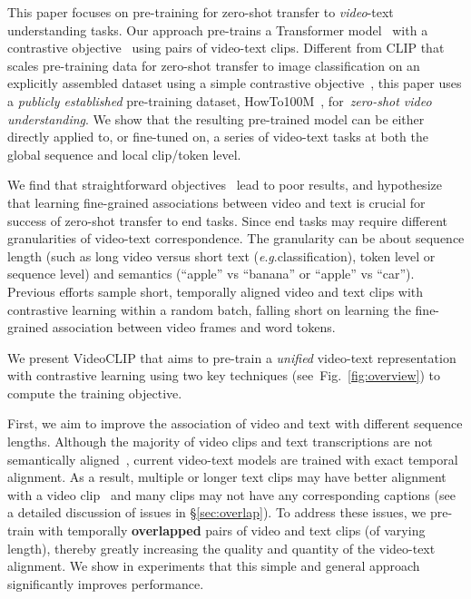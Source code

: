 \documentclass[11pt]{article}
\newcommand{\eg}{\textit{e}.\textit{g}.}
\begin{document}
This paper focuses on pre-training for zero-shot transfer to \textit{video}-text understanding tasks.
Our approach pre-trains a Transformer model~\cite{vaswani2017attention,devlin-etal-2019-bert} with a contrastive objective~\cite{oord2018representation,chen2020simple} using pairs of video-text clips. 
Different from CLIP that scales pre-training data for zero-shot transfer to image classification on an explicitly assembled dataset using a simple contrastive objective~\cite{chen2020simple}, this paper uses a \textit{publicly established} pre-training dataset, HowTo100M~\cite{miech2019howto100m}, for~\textit{zero-shot video understanding}. 
We show that the resulting pre-trained model can be either directly applied to, or fine-tuned on, a series of video-text tasks at both the global sequence and local clip/token level.
 


We find that straightforward objectives~\cite{chen2020simple} lead to poor results, and hypothesize that learning fine-grained associations between video and text is crucial for success of zero-shot transfer to end tasks. Since end tasks may require different granularities of video-text correspondence. The granularity can be about sequence length (such as long video versus short text (\eg classification), token level or sequence level) and semantics (``apple'' vs ``banana'' or ``apple'' vs ``car''). Previous efforts sample short, temporally aligned video and text clips with contrastive learning within a random batch, falling short on learning the fine-grained association between video frames and word tokens.


We present VideoCLIP 
that 
aims to pre-train a \textit{unified} video-text representation with contrastive learning using two key techniques (see~Fig.~\ref{fig:overview}) to compute the training objective. 


First, 
we aim to improve the association of video and text with different sequence lengths.
Although the majority of video clips and text transcriptions are not semantically aligned~\cite{miech2019howto100m}, current video-text models are trained with exact temporal alignment.
As a result, multiple or longer text clips may have better alignment with a video clip~\cite{miech2020end} and many
clips may not have any corresponding captions (see a detailed discussion of issues in \S \ref{sec:overlap}).
To address these issues, we pre-train with temporally \textbf{overlapped} pairs of video and text clips (of varying length), thereby greatly increasing the quality and quantity of the video-text alignment. 
We show in experiments that this simple and general approach significantly improves performance.
\end{document}
